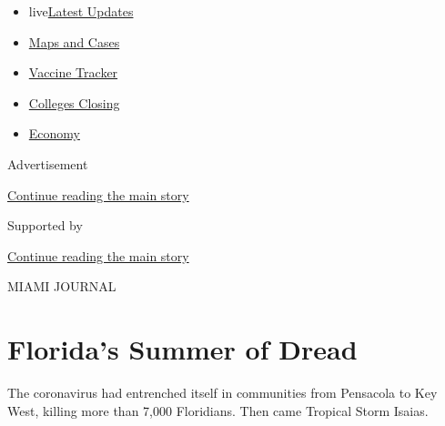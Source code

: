 \begin{itemize}
\tightlist
\item
  live\href{https://www.nytimes3xbfgragh.onion/2020/08/20/world/coronavirus-covid.html?name=styln-coronavirus-national\&region=TOP_BANNER\&variant=undefined\&block=storyline_menu_recirc\&action=click\&pgtype=Article\&impression_id=a1a3f0a1-e386-11ea-afce-73cba6f30df3}{Latest
  Updates}
\item
  \href{https://www.nytimes3xbfgragh.onion/interactive/2020/us/coronavirus-us-cases.html?name=styln-coronavirus-national\&region=TOP_BANNER\&variant=undefined\&block=storyline_menu_recirc\&action=click\&pgtype=Article\&impression_id=a1a3f0a2-e386-11ea-afce-73cba6f30df3}{Maps
  and Cases}
\item
  \href{https://www.nytimes3xbfgragh.onion/interactive/2020/science/coronavirus-vaccine-tracker.html?name=styln-coronavirus-national\&region=TOP_BANNER\&variant=undefined\&block=storyline_menu_recirc\&action=click\&pgtype=Article\&impression_id=a1a3f0a3-e386-11ea-afce-73cba6f30df3}{Vaccine
  Tracker}
\item
  \href{https://www.nytimes3xbfgragh.onion/2020/08/19/us/colleges-closing-covid.html?name=styln-coronavirus-national\&region=TOP_BANNER\&variant=undefined\&block=storyline_menu_recirc\&action=click\&pgtype=Article\&impression_id=a1a417b0-e386-11ea-afce-73cba6f30df3}{Colleges
  Closing}
\item
  \href{https://www.nytimes3xbfgragh.onion/live/2020/08/20/business/stock-market-today-coronavirus?name=styln-coronavirus-national\&region=TOP_BANNER\&variant=undefined\&block=storyline_menu_recirc\&action=click\&pgtype=Article\&impression_id=a1a417b1-e386-11ea-afce-73cba6f30df3}{Economy}
\end{itemize}

Advertisement

\protect\hyperlink{after-top}{Continue reading the main story}

Supported by

\protect\hyperlink{after-sponsor}{Continue reading the main story}

MIAMI JOURNAL

\hypertarget{floridas-summer-of-dread}{%
\section{Florida's Summer of Dread}\label{floridas-summer-of-dread}}

The coronavirus had entrenched itself in communities from Pensacola to
Key West, killing more than 7,000 Floridians. Then came Tropical Storm
Isaias.

